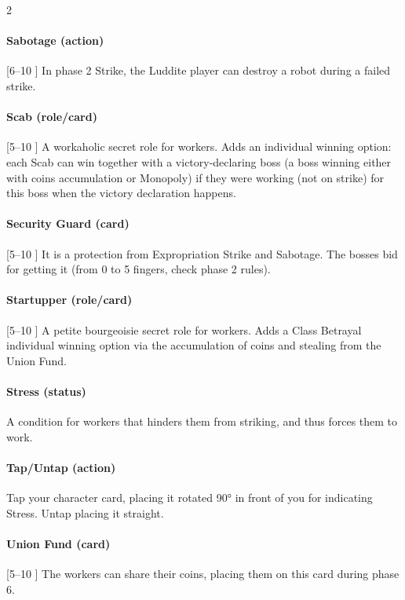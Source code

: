 \begin{multicols}{2}
        \paragraph{Sabotage (action)}
            [6–10 \faPeopleGroup] In phase 2 Strike, the Luddite player can destroy a
            robot during a failed strike.
        
        \paragraph{Scab (role/card)}
            [5–10 \faPeopleGroup] A workaholic secret role for workers. Adds an individual
            winning option: each Scab can win together with a victory-declaring boss
            (a boss winning either with coins accumulation or Monopoly) if they were working
            (not on strike) for this boss when the victory declaration happens.
        
        \paragraph{Security Guard (card)}
            [5–10 \faPeopleGroup] It is a protection from Expropriation Strike and
            Sabotage. The bosses bid for getting it (from 0 to 5 fingers, check phase 2 rules).
        
        \paragraph{Startupper (role/card)}
            [5–10 \faPeopleGroup] A petite bourgeoisie secret role for workers.
            Adds a Class Betrayal individual winning option via the accumulation of coins
            and stealing from the Union Fund.
        
        \paragraph{Stress (status)}
            A condition for workers that hinders them from striking, and thus
            forces them to work.
        
        \paragraph{Tap/Untap (action)}
            Tap your character card, placing it rotated 90° in front of
            you for indicating Stress. Untap placing it straight.
        
        \paragraph{Union Fund (card)}
            [5–10 \faPeopleGroup] The workers can share their coins, placing them on
            this card during phase 6.
    
    \end{multicols}

